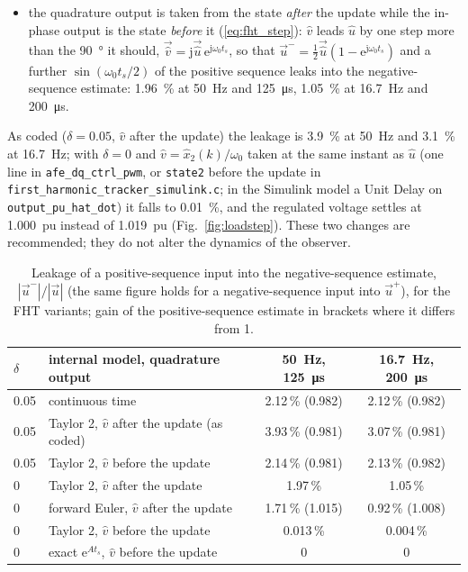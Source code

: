 \documentclass[10pt,a4paper]{scrartcl}
\newcommand{\ts}{t_s}
\newcommand{\wo}{\omega_0}
\newcommand{\jj}{\mathrm{j}}
\newcommand{\ee}{\mathrm{e}}
\newcommand{\code}[1]{\texttt{#1}}
\newcommand{\uhat}{\hat{u}}
\newcommand{\vhat}{\hat{v}}
\begin{document}
\begin{onehalfspace}
\begin{itemize}
\item the quadrature output is taken from the state \emph{after} the update while the in-phase output is the state \emph{before} it (\ref{eq:fht_step}): $\vhat$ leads $\uhat$ by one step more than the \SI{90}{\degree} it should, $\vec{\vhat} = \jj\vec{\uhat}\,\ee^{\jj\wo\ts}$, so that $\vec u^- = \tfrac12\vec{\uhat}(1 - \ee^{\jj\wo\ts})$ and a further $\sin(\wo\ts/2)$ of the positive sequence leaks into the negative-sequence estimate: \SI{1.96}{\percent} at \SI{50}{Hz} and \SI{125}{\micro s}, \SI{1.05}{\percent} at \SI{16.7}{Hz} and \SI{200}{\micro s}.
\end{itemize}
As coded ($\delta = 0.05$, $\vhat$ after the update) the leakage is \SI{3.9}{\percent} at \SI{50}{Hz} and \SI{3.1}{\percent} at \SI{16.7}{Hz}; with $\delta = 0$ and $\vhat = \hat x_2(k)/\wo$ taken at the same instant as $\uhat$ (one line in \code{afe\_dq\_ctrl\_pwm}, or \code{state2} before the update in \code{first\_harmonic\_tracker\_simulink.c}; in the Simulink model a Unit Delay on \code{output\_pu\_hat\_dot}) it falls to \SI{0.01}{\percent}, and the regulated voltage settles at \SI{1.000}{pu} instead of \SI{1.019}{pu} (Fig.~\ref{fig:loadstep}). These two changes are recommended; they do not alter the dynamics of the observer.

\begin{table}[htb]
\centering\small
\caption{Leakage of a positive-sequence input into the negative-sequence estimate, $|\vec u^-|/|\vec u|$ (the same figure holds for a negative-sequence input into $\vec u^+$), for the FHT variants; gain of the positive-sequence estimate in brackets where it differs from 1.}
\label{tab:fht}
\begin{tabular}{@{}llcc@{}}
\toprule
$\delta$ & internal model, quadrature output & \SI{50}{Hz}, \SI{125}{\micro s} & \SI{16.7}{Hz}, \SI{200}{\micro s} \\
\midrule
0.05 & continuous time & 2.12\,\% (0.982) & 2.12\,\% (0.982) \\
0.05 & Taylor 2, $\vhat$ after the update (as coded) & 3.93\,\% (0.981) & 3.07\,\% (0.981) \\
0.05 & Taylor 2, $\vhat$ before the update & 2.14\,\% (0.981) & 2.13\,\% (0.982) \\
0 & Taylor 2, $\vhat$ after the update & 1.97\,\% & 1.05\,\% \\
0 & forward Euler, $\vhat$ after the update & 1.71\,\% (1.015) & 0.92\,\% (1.008) \\
0 & Taylor 2, $\vhat$ before the update & 0.013\,\% & 0.004\,\% \\
0 & exact $\ee^{A\ts}$, $\vhat$ before the update & 0 & 0 \\
\bottomrule
\end{tabular}
\end{table}


\end{onehalfspace}
\end{document}
